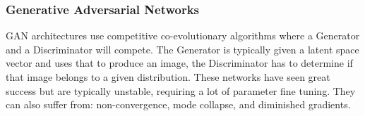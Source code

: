 \documentclass{UoYCSproject}
\begin{document}
\subsubsection{Generative Adversarial Networks}





GAN architectures\cite{goodfellow2014generative} use competitive co-evolutionary algorithms where a Generator and a Discriminator will compete. The Generator is typically given a latent space vector and uses that to produce an image, the Discriminator has to determine if that image belongs to a given distribution. These networks have seen great success
but are typically unstable, requiring a lot of parameter fine tuning.
They can also suffer from: non-convergence, mode collapse, and diminished gradients.
\end{document}
